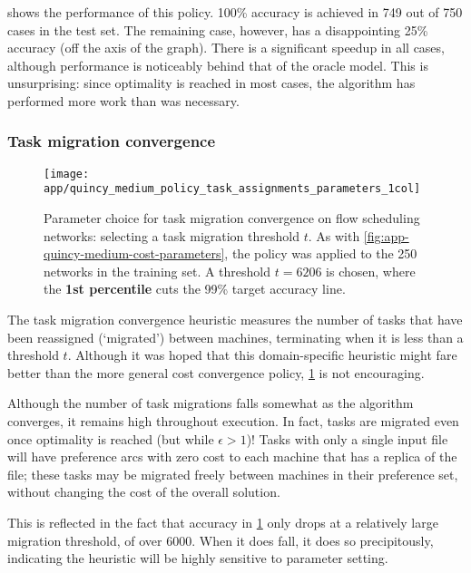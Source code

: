  shows the performance of this policy. 100\% accuracy is achieved in 749 out of 750 cases in the test set. The remaining case, however, has a disappointing 25\% accuracy (off the axis of the graph). There is a significant speedup in all cases, although performance is noticeably behind that of the oracle model. This is unsurprising: since optimality is reached in most cases, the algorithm has performed more work than was necessary.

\subsubsection{Task migration convergence}

\begin{figure}
    \centering
    \texttt{[image: app/quincy\_medium\_policy\_task\_assignments\_parameters\_1col]}
    \caption[Parameter choice for task migration convergence with flow scheduling]{Parameter choice for task migration convergence on flow scheduling networks: selecting a task migration threshold $t$. As with \cref{fig:app-quincy-medium-cost-parameters}, the policy was applied to the 250 networks in the training set. A threshold $t=6206$ is chosen, where the \textbf{\color{matplotlib_blue} 1st percentile} cuts the 99\% target accuracy line.}
    \label{fig:app-quincy-medium-task-assignment-parameters}
\end{figure}

The task migration convergence heuristic measures the number of tasks that have been reassigned (`migrated') between machines, terminating when it is less than a threshold $t$. Although it was hoped that this domain-specific heuristic might fare better than the more general cost convergence policy, \cref{fig:app-quincy-medium-task-assignment-parameters} is not encouraging. 

Although the number of task migrations falls somewhat as the algorithm converges, it remains high throughout execution. In fact, tasks are migrated even once optimality is reached (but while $\epsilon > 1$)! Tasks with only a single input file will have preference arcs with zero cost to each machine that has a replica of the file; these tasks may be migrated freely between machines in their preference set, without changing the cost of the overall solution.

This is reflected in the fact that accuracy in \cref{fig:app-quincy-medium-task-assignment-parameters} only drops at a relatively large migration threshold, of over $6000$. When it does fall, it does so precipitously, indicating the heuristic will be highly sensitive to parameter setting.

